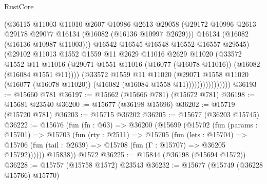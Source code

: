 \begin{lexlean}{RustCore}
\begin{coremodule}
                            (@36115
                              @11003
                              @11010
                              @2607
                              @10986
                              @2613
                              @29058
                              (@29172
                                @10996
                                @2613
                                @29178
                                @29077
                                @16134
                                (@16082 (@16136 @10997 @2629)))
                              @16134
                              (@16082 (@16136 @10987 @11003)))
                            @16542
                            @16545
                            @16548
                            @16552
                            @16557
                            @29545)
                          (@29102
                            @11013
                            @1552
                            @1559
                            @11
                            @2629
                            @11016
                            @2629
                            @11020
                            (@33572
                              @1552
                              @11
                              @11016
                              (@29071
                                @1551
                                @11016
                                (@16077 (@16078 @11016))
                                (@16082 (@16084 @1551 @11))))
                            (@33572
                              @1559
                              @11
                              @11020
                              (@29071
                                @1558
                                @11020
                                (@16077 (@16078 @11020))
                                (@16082 (@16084 @1558 @11))))))))))))))))
@36193 := @15660 @781
@36197 := @15662 (@15666 @781) (@15672 @781)
@36198 := @15681 @23540
@36200 := @15677 (@36198 @15696)
@36202 := @15719 (@15720 @781)
@36203 := @15715 @36202
@36205 := @15677 (@36203 @15745)
@36222 := @15676
    (fun (fn : @63) =>
    @36200
      (@15699
        (@15702
          (fun (params : @15701) =>
          @15703
            (fun (rty : @2511) =>
            @15705
              (fun (lets : @15704) =>
              @15706 (fun (tail : @2639) => @15708 (fun (Γ : @15707) => @36205 @15792))))))
        @15838))
    @1572
@36225 := @15844 (@36198 (@15694 @1572))
@36228 := @15757 (@15758 @1572) @23543
@36232 := @15677 (@15749 (@36228 @15766) @15770)

\end{coremodule}
\end{lexlean}
